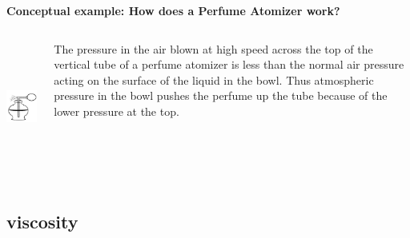 \documentclass[]{beamer}
\begin{document}
\begin{frame}



\textbf{Conceptual example: How does a Perfume Atomizer work?}

\vspace{5mm}



   \begin{columns}[c]
   \column{2in}  %
  
  \begin{center}
  \includegraphics[height=1.7in]{images2/aspersor.jpg}
\end{center}



   \column{2in}

\pause

The pressure in the air blown at high speed across the top of
the vertical tube of a perfume atomizer is less than the normal air
pressure acting on the surface of the liquid in the bowl. Thus atmospheric pressure
in the bowl pushes the perfume up the tube because of the lower pressure at the
top.


   \end{columns}



 \end{frame}







\subsection{viscosity}
\end{document}
